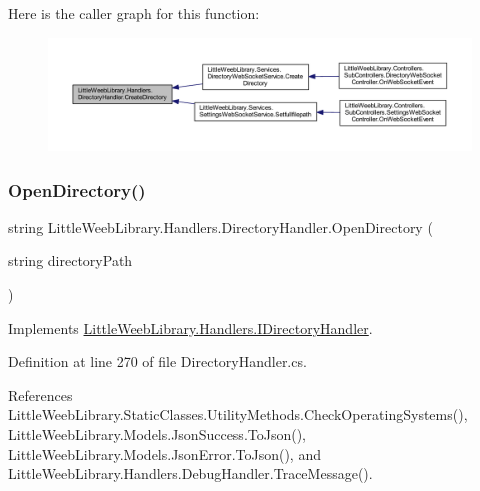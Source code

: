 Here is the caller graph for this function\+:\nopagebreak
\begin{figure}[H]
\begin{center}
\leavevmode
\includegraphics[width=350pt]{class_little_weeb_library_1_1_handlers_1_1_directory_handler_a6be1b158ee280e8a74a49917a90484e2_icgraph}
\end{center}
\end{figure}
\mbox{\label{class_little_weeb_library_1_1_handlers_1_1_directory_handler_a4f3f5841ead561873cc5130efc6294aa}} 
\subsubsection{\texorpdfstring{Open\+Directory()}{OpenDirectory()}}
{\footnotesize\ttfamily string Little\+Weeb\+Library.\+Handlers.\+Directory\+Handler.\+Open\+Directory (\begin{DoxyParamCaption}\item[{string}]{directory\+Path }\end{DoxyParamCaption})}



Implements \mbox{\hyperlink{interface_little_weeb_library_1_1_handlers_1_1_i_directory_handler_a43ca9f14498ef3b9cfbdf960b877ac19}{Little\+Weeb\+Library.\+Handlers.\+I\+Directory\+Handler}}.



Definition at line 270 of file Directory\+Handler.\+cs.



References Little\+Weeb\+Library.\+Static\+Classes.\+Utility\+Methods.\+Check\+Operating\+Systems(), Little\+Weeb\+Library.\+Models.\+Json\+Success.\+To\+Json(), Little\+Weeb\+Library.\+Models.\+Json\+Error.\+To\+Json(), and Little\+Weeb\+Library.\+Handlers.\+Debug\+Handler.\+Trace\+Message().



